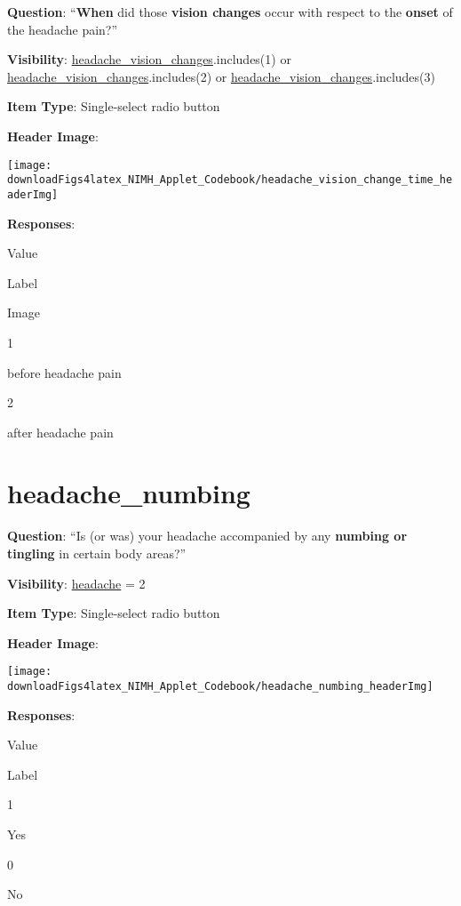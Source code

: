 \documentclass[]{book}
\begin{document}
\textbf{Question}: ``\textbf{When} did those \textbf{vision changes} occur with respect to the \textbf{onset} of the headache pain?''

\textbf{Visibility}: \protect\hyperlink{headache_vision_changes}{headache\_vision\_changes}.includes(1) or \protect\hyperlink{headache_vision_changes}{headache\_vision\_changes}.includes(2) or \protect\hyperlink{headache_vision_changes}{headache\_vision\_changes}.includes(3)

\textbf{Item Type}: Single-select radio button

\textbf{Header Image}:

\begin{flushleft}\texttt{[image: downloadFigs4latex\_NIMH\_Applet\_Codebook/headache\_vision\_change\_time\_headerImg]} \end{flushleft}

\textbf{Responses}:

Value

Label

Image

1

before headache pain

2

after headache pain

\hypertarget{headache_numbing}{%
\section{headache\_numbing}\label{headache_numbing}}

\textbf{Question}: ``Is (or was) your headache accompanied by any \textbf{numbing or tingling} in certain body areas?''

\textbf{Visibility}: \protect\hyperlink{headache}{headache} = 2

\textbf{Item Type}: Single-select radio button

\textbf{Header Image}:

\begin{flushleft}\texttt{[image: downloadFigs4latex\_NIMH\_Applet\_Codebook/headache\_numbing\_headerImg]} \end{flushleft}

\textbf{Responses}:

Value

Label

1

Yes

0

No
\end{document}
